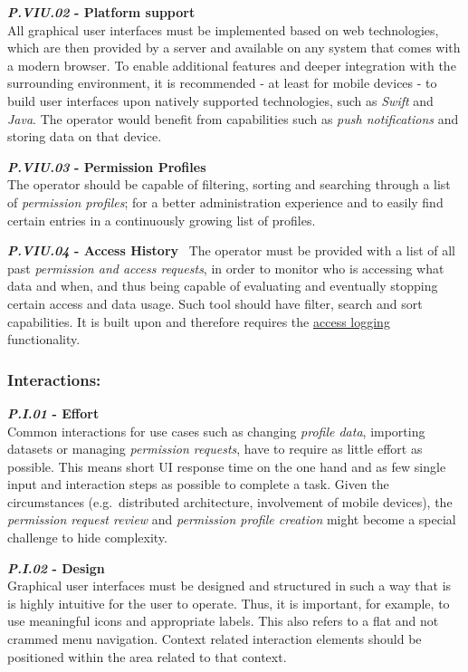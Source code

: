 \documentclass[12pt,english,a4paper,titlepage,cleardoublepage=empty,dottedtoc]{report}
\begin{document}
\textbf{\emph{\protect\hypertarget{pviu02}{}{P.VIU.02}} - Platform
support}\\
All graphical user interfaces must be implemented based on web
technologies, which are then provided by a server and available on any
system that comes with a modern browser. To enable additional features
and deeper integration with the surrounding environment, it is
recommended - at least for mobile devices - to build user interfaces
upon natively supported technologies, such as \emph{Swift} and
\emph{Java}. The operator would benefit from capabilities such as
\emph{push notifications} and storing data on that device.

\textbf{\emph{\protect\hypertarget{pviu03}{}{P.VIU.03}} - Permission
Profiles}\\
The operator should be capable of filtering, sorting and searching
through a list of \emph{permission profiles}; for a better
administration experience and to easily find certain entries in a
continuously growing list of profiles.

\textbf{\emph{\protect\hypertarget{pviu04}{}{P.VIU.04}} - Access
History}~ The operator must be provided with a list of all past
\emph{permission and access requests}, in order to monitor who is
accessing what data and when, and thus being capable of evaluating and
eventually stopping certain access and data usage. Such tool should have
filter, search and sort capabilities. It is built upon and therefore
requires the \protect\hyperlink{pb01}{access logging} functionality.

\subsubsection*{Interactions:}\label{interactions}

\textbf{\emph{\protect\hypertarget{pi01}{}{P.I.01}} - Effort}\\
Common interactions for use cases such as changing \emph{profile data},
importing datasets or managing \emph{permission requests}, have to
require as little effort as possible. This means short UI response time
on the one hand and as few single input and interaction steps as
possible to complete a task. Given the circumstances (e.g.~distributed
architecture, involvement of mobile devices), the \emph{permission
request review} and \emph{permission profile creation} might become a
special challenge to hide complexity.

\textbf{\emph{\protect\hypertarget{pi02}{}{P.I.02}} - Design}\\
Graphical user interfaces must be designed and structured in such a way
that is is highly intuitive for the user to operate. Thus, it is
important, for example, to use meaningful icons and appropriate labels.
This also refers to a flat and not crammed menu navigation. Context
related interaction elements should be positioned within the area
related to that context.
\end{document}
